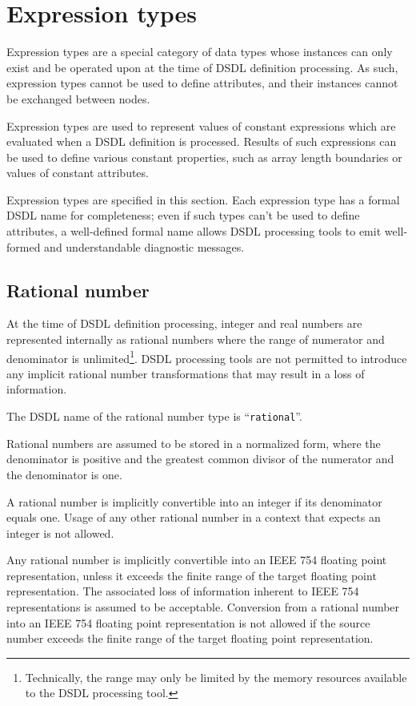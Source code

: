 
\section{Expression types}\label{sec:dsdl_expression_types}

Expression types are a special category of data types whose instances can only exist and be operated upon
at the time of DSDL definition processing.
As such, expression types cannot be used to define attributes,
and their instances cannot be exchanged between nodes.

Expression types are used to represent values of constant expressions which are evaluated
when a DSDL definition is processed.
Results of such expressions can be used to define various constant properties,
such as array length boundaries or values of constant attributes.

Expression types are specified in this section.
Each expression type has a formal DSDL name for completeness;
even if such types can't be used to define attributes,
a well-defined formal name allows DSDL processing tools to emit well-formed
and understandable diagnostic messages.

\subsection{Rational number}\label{sec:dsdl_rational}

At the time of DSDL definition processing, integer and real numbers are represented internally as rational numbers
where the range of numerator and denominator is unlimited\footnote{%
Technically, the range may only be limited by the memory resources available to the DSDL processing tool.}.
DSDL processing tools are not permitted to introduce any implicit rational number transformations that
may result in a loss of information.

The DSDL name of the rational number type is ``\verb|rational|''.

Rational numbers are assumed to be stored in a normalized form, where the denominator is positive
and the greatest common divisor of the numerator and the denominator is one.

A rational number is implicitly convertible into an integer if its denominator equals one.
Usage of any other rational number in a context that expects an integer is not allowed.

Any rational number is implicitly convertible into an IEEE 754 floating point representation,
unless it exceeds the finite range of the target floating point representation.
The associated loss of information inherent to IEEE 754 representations is assumed to be acceptable.
Conversion from a rational number into an IEEE 754 floating point representation
is not allowed if the source number exceeds the finite range of the target floating point representation.

